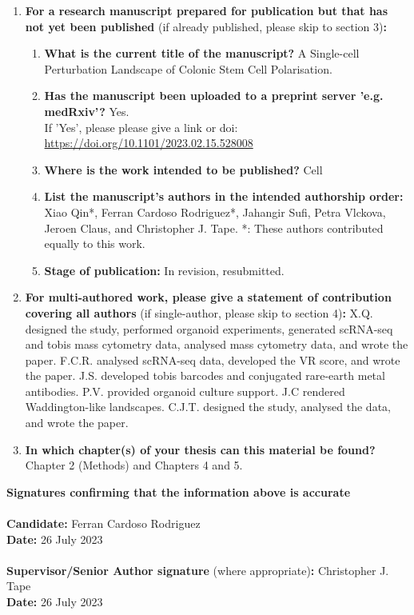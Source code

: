 \begin{enumerate}
        \item \textbf{For a research manuscript prepared for publication but that has not yet been published} (if already published, please skip to section 3)\textbf{:}
        \begin{enumerate}\itemsep0em
            \item \textbf{What is the current title of the manuscript?}
            A Single-cell Perturbation Landscape of Colonic Stem Cell Polarisation.
            \item \textbf{Has the manuscript been uploaded to a preprint server 'e.g. medRxiv'?} 
            Yes.\\
            If 'Yes', please please give a link or doi:
            \url{https://doi.org/10.1101/2023.02.15.528008}
            \item \textbf{Where is the work intended to be published?}
            Cell
            \item \textbf{List the manuscript's authors in the intended authorship order:}
            Xiao Qin*, Ferran Cardoso Rodriguez*, Jahangir Sufi, Petra Vlckova, Jeroen Claus, and Christopher J. Tape.
            *: These authors contributed equally to this work.
            \item \textbf{Stage of publication:}
            In revision, resubmitted.
        \end{enumerate}
        
        \item \textbf{For multi-authored work, please give a statement of contribution covering all authors} (if single-author, please skip to section 4)\textbf{:}
        X.Q. designed the study, performed organoid experiments, generated scRNA-seq and \acrshort{tobis} mass cytometry data, analysed mass cytometry data, and wrote the paper. F.C.R. analysed scRNA-seq data, developed the VR score, and wrote the paper. J.S. developed \acrshort{tobis} barcodes and conjugated rare-earth metal antibodies. P.V. provided organoid culture support. J.C rendered Waddington-like landscapes. C.J.T. designed the study, analysed the data, and wrote the paper.
        \item \textbf{In which chapter(s) of your thesis can this material be found?}
        Chapter 2 (Methods) and Chapters 4 and 5.
    \end{enumerate}
    
    \textbf{Signatures confirming that the information above is accurate}\\
    \textbf{}\\ 
    \textbf{Candidate:} Ferran Cardoso Rodriguez\\
    \textbf{Date:} 26 July 2023\\
    \textbf{}\\
    \textbf{Supervisor/Senior Author signature} (where appropriate)\textbf{:} Christopher J. Tape\\
    \textbf{Date:} 26 July 2023	


